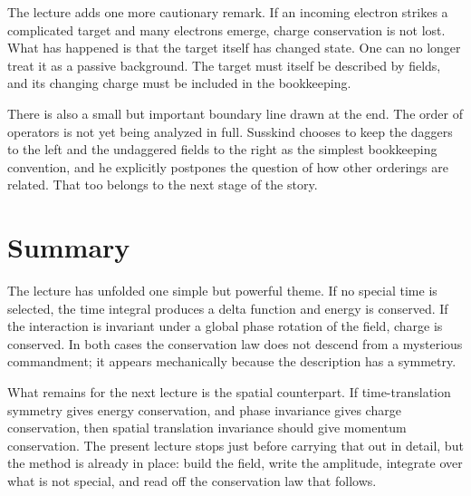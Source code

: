 The lecture adds one more cautionary remark. If an incoming electron strikes a complicated target and many electrons emerge, charge conservation is not lost. What has happened is that the target itself has changed state. One can no longer treat it as a passive background. The target must itself be described by fields, and its changing charge must be included in the bookkeeping.

There is also a small but important boundary line drawn at the end. The order of operators is not yet being analyzed in full. Susskind chooses to keep the daggers to the left and the undaggered fields to the right as the simplest bookkeeping convention, and he explicitly postpones the question of how other orderings are related. That too belongs to the next stage of the story.

\section{Summary}

The lecture has unfolded one simple but powerful theme. If no special time is selected, the time integral produces a delta function and energy is conserved. If the interaction is invariant under a global phase rotation of the field, charge is conserved. In both cases the conservation law does not descend from a mysterious commandment; it appears mechanically because the description has a symmetry.

What remains for the next lecture is the spatial counterpart. If time-translation symmetry gives energy conservation, and phase invariance gives charge conservation, then spatial translation invariance should give momentum conservation. The present lecture stops just before carrying that out in detail, but the method is already in place: build the field, write the amplitude, integrate over what is not special, and read off the conservation law that follows.